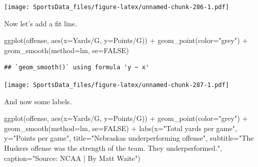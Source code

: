 \documentclass[
]{book}
\newenvironment{Shaded}{\begin{snugshade}}{\end{snugshade}}
\newcommand{\AttributeTok}[1]{\textcolor[rgb]{0.77,0.63,0.00}{#1}}
\newcommand{\ConstantTok}[1]{\textcolor[rgb]{0.00,0.00,0.00}{#1}}
\newcommand{\FunctionTok}[1]{\textcolor[rgb]{0.00,0.00,0.00}{#1}}
\newcommand{\NormalTok}[1]{#1}
\newcommand{\SpecialCharTok}[1]{\textcolor[rgb]{0.00,0.00,0.00}{#1}}
\newcommand{\StringTok}[1]{\textcolor[rgb]{0.31,0.60,0.02}{#1}}
\begin{document}
\texttt{[image: SportsData\_files/figure-latex/unnamed-chunk-286-1.pdf]}

Now let's add a fit line.

\begin{Shaded}
\begin{Highlighting}[]
\FunctionTok{ggplot}\NormalTok{(offense, }\FunctionTok{aes}\NormalTok{(}\AttributeTok{x=}\StringTok{\textasciigrave{}}\AttributeTok{Yards/G}\StringTok{\textasciigrave{}}\NormalTok{, }\AttributeTok{y=}\StringTok{\textasciigrave{}}\AttributeTok{Points/G}\StringTok{\textasciigrave{}}\NormalTok{)) }\SpecialCharTok{+} 
  \FunctionTok{geom\_point}\NormalTok{(}\AttributeTok{color=}\StringTok{"grey"}\NormalTok{) }\SpecialCharTok{+} \FunctionTok{geom\_smooth}\NormalTok{(}\AttributeTok{method=}\NormalTok{lm, }\AttributeTok{se=}\ConstantTok{FALSE}\NormalTok{)}
\end{Highlighting}
\end{Shaded}

\begin{verbatim}
## `geom_smooth()` using formula 'y ~ x'
\end{verbatim}

\texttt{[image: SportsData\_files/figure-latex/unnamed-chunk-287-1.pdf]}

And now some labels.

\begin{Shaded}
\begin{Highlighting}[]
\FunctionTok{ggplot}\NormalTok{(offense, }\FunctionTok{aes}\NormalTok{(}\AttributeTok{x=}\StringTok{\textasciigrave{}}\AttributeTok{Yards/G}\StringTok{\textasciigrave{}}\NormalTok{, }\AttributeTok{y=}\StringTok{\textasciigrave{}}\AttributeTok{Points/G}\StringTok{\textasciigrave{}}\NormalTok{)) }\SpecialCharTok{+} 
  \FunctionTok{geom\_point}\NormalTok{(}\AttributeTok{color=}\StringTok{"grey"}\NormalTok{) }\SpecialCharTok{+} \FunctionTok{geom\_smooth}\NormalTok{(}\AttributeTok{method=}\NormalTok{lm, }\AttributeTok{se=}\ConstantTok{FALSE}\NormalTok{) }\SpecialCharTok{+} 
  \FunctionTok{labs}\NormalTok{(}\AttributeTok{x=}\StringTok{"Total yards per game"}\NormalTok{, }\AttributeTok{y=}\StringTok{"Points per game"}\NormalTok{, }\AttributeTok{title=}\StringTok{"Nebraska\textquotesingle{}s underperforming offense"}\NormalTok{, }\AttributeTok{subtitle=}\StringTok{"The Husker\textquotesingle{}s offense was the strength of the team. They underperformed."}\NormalTok{, }\AttributeTok{caption=}\StringTok{"Source: NCAA | By Matt Waite"}\NormalTok{)}
\end{Highlighting}
\end{Shaded}
\end{document}
